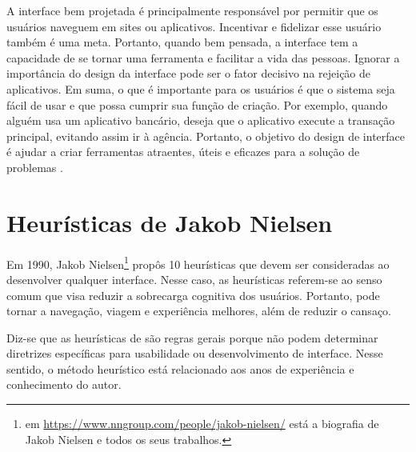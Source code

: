 A interface bem projetada é principalmente responsável por permitir que os usuários naveguem em sites ou aplicativos. Incentivar e fidelizar esse usuário também é uma meta. Portanto, quando bem pensada, a interface tem a capacidade de se tornar uma ferramenta e facilitar a vida das pessoas. Ignorar a importância do design da interface pode ser o fator decisivo na rejeição de aplicativos. Em suma, o que é importante para os usuários é que o sistema seja fácil de usar e que possa cumprir sua função de criação. Por exemplo, quando alguém usa um aplicativo bancário, deseja que o aplicativo execute a transação principal, evitando assim ir à agência. Portanto, o objetivo do design de interface é ajudar a criar ferramentas atraentes, úteis e eficazes para a solução de problemas \cite{maia2016designui}.

\section{Heurísticas de Jakob Nielsen}
\label{Heurísticas de Jakob Nielsen}

Em 1990, Jakob Nielsen\footnote{em \url{https://www.nngroup.com/people/jakob-nielsen/} está a biografia de Jakob Nielsen e todos os seus trabalhos.} propôs 10 heurísticas que devem ser consideradas ao desenvolver qualquer interface. Nesse caso, as heurísticas referem-se ao senso comum que visa reduzir a sobrecarga cognitiva dos usuários. Portanto, pode tornar a navegação, viagem e experiência melhores, além de reduzir o cansaço. 

Diz-se que as heurísticas de  são regras gerais porque não podem determinar diretrizes específicas para usabilidade ou desenvolvimento de interface. Nesse sentido, o método heurístico está relacionado aos anos de experiência e conhecimento do autor.

